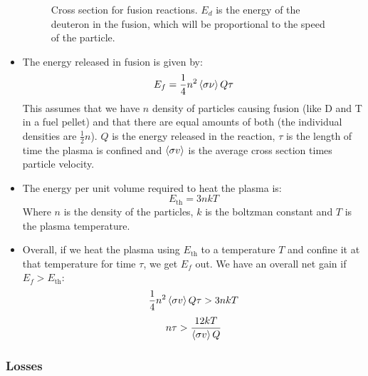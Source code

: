 \documentclass[letter]{article}
\begin{document}
\begin{itemize}
\begin{figure}[hbtp]
    \caption{Cross section for fusion
      reactions. $E_d$ is the energy of the deuteron in the fusion,
      which will be proportional to the speed of the particle.~\cite[pp. 532]{krane}}
    \label{fig:fusion_xsec}
  \end{figure}
\item The energy released in fusion is given by:
  \begin{equation*}
    E_f = \frac{1}{4}n^2\braket{\sigma\nu}Q\tau
  \end{equation*}
This assumes that we have $n$ density of particles causing fusion (like D
and T in a fuel pellet) and that there are equal amounts of both (the
individual densities are $\frac{1}{2}n$). $Q$ is the energy released
in the reaction, $\tau$ is the length of time the plasma is confined
and $\braket{\sigma{}v}$ is the average cross section times particle
velocity.~\cite[pp. 541]{krane}
\item The energy per unit volume required to heat the plasma is:
  \begin{equation*}
    E_{\text{th}} = 3nkT
  \end{equation*}
Where $n$ is the density of the particles, $k$ is the boltzman
constant and $T$ is the plasma temperature.~\cite[pp. 541]{krane}
\item Overall, if we heat the plasma using $E_{\text{th}}$ to a
  temperature $T$ and confine it at that temperature for time $\tau$,
  we get $E_f$ out. We have an overall net gain if $E_f >
  E_{\text{th}}$:
  \begin{equation*}
    \frac{1}{4}n^2\braket{\sigma{}v}Q\tau > 3nkT
  \end{equation*}
  \begin{equation*}
    n\tau > \frac{12kT}{\braket{\sigma{}v}Q}
  \end{equation*}
\cite[pp. 541-542]{krane}
\end{itemize}

\subsubsection{Losses}
\end{document}

